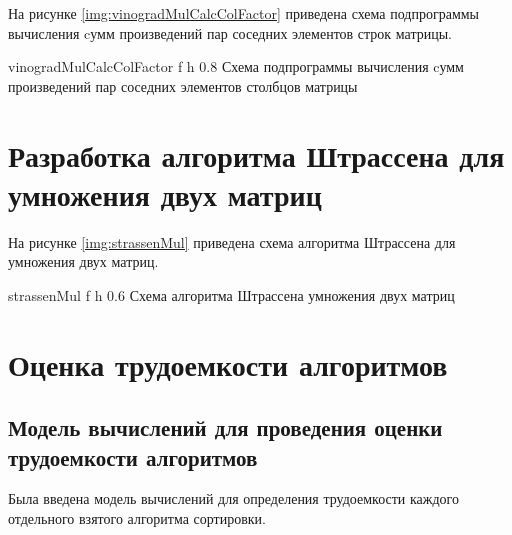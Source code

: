 \clearpage

На рисунке \ref{img:vinogradMulCalcColFactor} приведена схема подпрограммы вычисления cумм произведений пар соседних элементов строк матрицы.

{vinogradMulCalcColFactor} %
{f} %
{h} %
{0.8\textwidth} %
{Схема подпрограммы вычисления cумм произведений пар соседних элементов столбцов матрицы} %

\clearpage

\section{Разработка алгоритма Штрассена для умножения двух матриц}

На рисунке \ref{img:strassenMul} приведена схема алгоритма Штрассена для умножения двух матриц.

{strassenMul} %
{f} %
{h} %
{0.6\textwidth} %
{Схема алгоритма Штрассена умножения двух матриц} %

\clearpage

\section{Оценка трудоемкости алгоритмов}

\subsection{Модель вычислений для проведения оценки трудоемкости алгоритмов}

Была введена модель вычислений для определения трудоемкости каждого отдельного взятого алгоритма сортировки.

